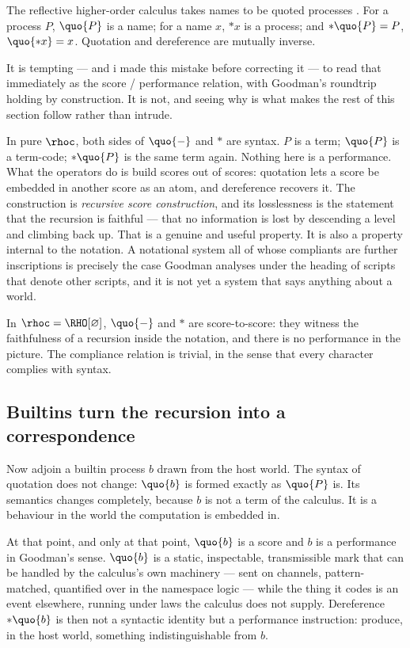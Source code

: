 The reflective higher-order calculus takes names to be quoted
processes \cite{meredith2005rho}.
For a process $P$, $\quo{P}$ is a name; for a name $x$, $*x$ is a
process; and $*\quo{P} = P$, $\quo{*x} = x$.
Quotation and dereference are mutually inverse.

It is tempting --- and i made this mistake before correcting it ---
to read that immediately as the score / performance relation, with
Goodman's roundtrip holding by construction.
It is not, and seeing why is what makes the rest of this section
follow rather than intrude.

In pure $\rhoc$, both sides of $\quo{-}$ and $*$ are syntax.
$P$ is a term; $\quo{P}$ is a term-code; $*\quo{P}$ is the same
term again.
Nothing here is a performance.
What the operators do is build scores out of scores: quotation lets
a score be embedded in another score as an atom, and dereference
recovers it.
The construction is \emph{recursive score construction}, and its
losslessness is the statement that the recursion is faithful ---
that no information is lost by descending a level and climbing back
up.
That is a genuine and useful property.
It is also a property internal to the notation.
A notational system all of whose compliants are further
inscriptions is precisely the case Goodman analyses under the
heading of scripts that denote other scripts, and it is not yet a
system that says anything about a world.

\begin{observation}
\label{obs:tworeadings}
In $\rhoc = \RHO[\varnothing]$, $\quo{-}$ and $*$ are
score-to-score: they witness the faithfulness of a recursion inside
the notation, and there is no performance in the picture.
The compliance relation is trivial, in the sense that every
character complies with syntax.
\end{observation}

\subsection{Builtins turn the recursion into a correspondence}
\label{sec:turn-of-operators}

Now adjoin a builtin process $b$ drawn from the host world.
The syntax of quotation does not change: $\quo{b}$ is formed
exactly as $\quo{P}$ is.
Its semantics changes completely, because $b$ is not a term of the
calculus.
It is a behaviour in the world the computation is embedded in.

At that point, and only at that point, $\quo{b}$ is a score and $b$
is a performance in Goodman's sense.
$\quo{b}$ is a static, inspectable, transmissible mark that can be
handled by the calculus's own machinery --- sent on channels,
pattern-matched, quantified over in the namespace logic --- while
the thing it codes is an event elsewhere, running under laws the
calculus does not supply.
Dereference $*\quo{b}$ is then not a syntactic identity but a
performance instruction: produce, in the host world, something
indistinguishable from $b$.

